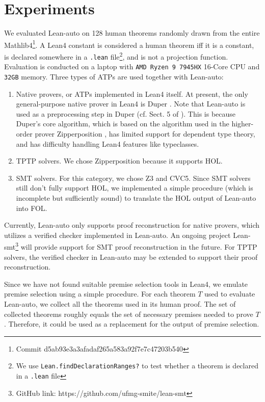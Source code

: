 \section{Experiments}\label{sectexpr}

  We evaluated Lean-auto on 128 human theorems randomly drawn from the entire
  Mathlib4\footnote{Commit d5ab93e3a3afadaf265a583a92f7e7c47203b540}. A
  Lean4 constant is considered a human theorem iff it is a constant,
  is declared somewhere in a \texttt{.lean} file\footnote{We use
  \texttt{Lean.findDeclarationRanges?} to test whether a theorem is
  declared in a \texttt{.lean} file}, and is not a projection function.
  Evaluation is conducted on a laptop
  with \texttt{AMD Ryzen 9 7945HX} 16-Core CPU and \texttt{32GB} memory.
  Three types of ATPs are used together with Lean-auto:
  \begin{enumerate}
    \item Native provers, or ATPs implemented in Lean4 itself. At present, the only general-purpose
      native prover in Lean4 is Duper \cite{DuperPaper}. Note that Lean-auto is
      used as a preprocessing step in Duper (cf. Sect. 5 of \cite{DuperPaper}).
      This is because Duper's core algorithm, which is based on the algorithm used
      in the higher-order prover Zipperposition \cite{ZipperpositionMakeWork}, has limited support for dependent
      type theory, and has difficulty handling Lean4 features like typeclasses.
    \item TPTP solvers. We chose Zipperposition because it supports HOL.
    \item SMT solvers. For this category, we chose Z3 and CVC5. Since SMT solvers
      still don't fully support HOL, we implemented a simple procedure
      (which is incomplete but sufficiently sound) to translate the HOL output of Lean-auto into FOL.
  \end{enumerate}

  Currently, Lean-auto only supports proof reconstruction for native provers,
  which utilizes a verified checker implemented in Lean-auto. An
  ongoing project Lean-smt\footnote{GitHub link: https://github.com/ufmg-smite/lean-smt}
  will provide support for SMT proof reconstruction in the future. For TPTP solvers,
  the verified checker in Lean-auto may be extended to support their proof reconstruction.

  Since we have not found suitable premise selection tools in Lean4, we emulate
  premise selection using a simple procedure. For each theorem $T$ used to evaluate
  Lean-auto, we collect all the theorems used in its human proof. The set of collected theorems
  roughly equals the set of necessary premises needed to prove $T$. Therefore, it could
  be used as a replacement for the output of premise selection.

